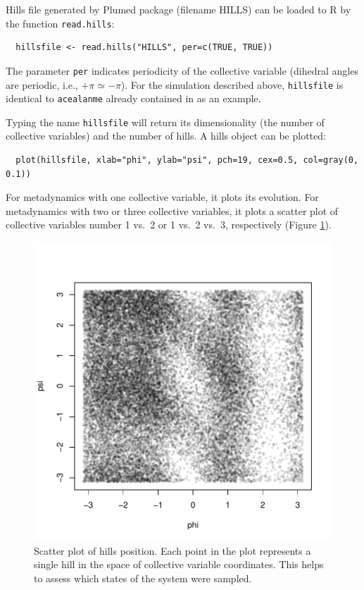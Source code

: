 Hills file generated by Plumed package (filename HILLS) can be loaded to
R by the function \texttt{read.hills}:

\begin{verbatim}
  hillsfile <- read.hills("HILLS", per=c(TRUE, TRUE))
\end{verbatim}

The parameter \texttt{per} indicates periodicity of the collective
variable (dihedral angles are periodic, i.e., \(+\pi \simeq -\pi\)). For
the simulation described above, \texttt{hillsfile} is identical to
\texttt{acealanme} already contained in  as an
example.

Typing the name \texttt{hillsfile} will return its dimensionality (the
number of collective variables) and the number of hills. A hills object
can be plotted:

\begin{verbatim}
  plot(hillsfile, xlab="phi", ylab="psi", pch=19, cex=0.5, col=gray(0, 0.1))
\end{verbatim}

For metadynamics with one collective variable, it plots its evolution.
For metadynamics with two or three collective variables, it plots a
scatter plot of collective variables number 1 vs.~2 or 1 vs.~2 vs.~3,
respectively (Figure \ref{fig:plothills}).

\begin{Schunk}
\begin{figure}

{\centering \includegraphics[width=0.8\linewidth]{metadynminer_files/figure-latex/plothills-1} 

}

\caption[Scatter plot of hills position]{Scatter plot of hills position. Each point in the plot represents a single hill in the space of collective variable coordinates. This helps to assess which states of the system were sampled.}\label{fig:plothills}
\end{figure}
\end{Schunk}

